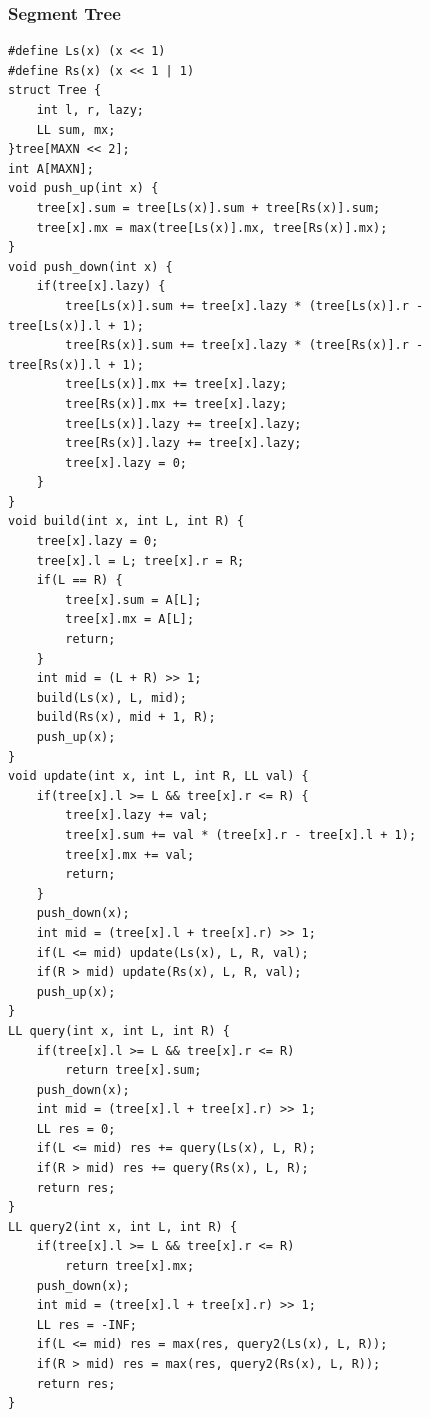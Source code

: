 \documentclass[10pt]{ctexart}
\begin{document}
{\subsubsection{Segment Tree}
\begin{lstlisting}
#define Ls(x) (x << 1)
#define Rs(x) (x << 1 | 1)
struct Tree {
    int l, r, lazy;
    LL sum, mx;
}tree[MAXN << 2];
int A[MAXN];
void push_up(int x) {
    tree[x].sum = tree[Ls(x)].sum + tree[Rs(x)].sum;
    tree[x].mx = max(tree[Ls(x)].mx, tree[Rs(x)].mx);
}
void push_down(int x) {
    if(tree[x].lazy) {
        tree[Ls(x)].sum += tree[x].lazy * (tree[Ls(x)].r - tree[Ls(x)].l + 1);
        tree[Rs(x)].sum += tree[x].lazy * (tree[Rs(x)].r - tree[Rs(x)].l + 1);
        tree[Ls(x)].mx += tree[x].lazy;
        tree[Rs(x)].mx += tree[x].lazy;
        tree[Ls(x)].lazy += tree[x].lazy;
        tree[Rs(x)].lazy += tree[x].lazy;
        tree[x].lazy = 0;
    }
}
void build(int x, int L, int R) {
    tree[x].lazy = 0;
    tree[x].l = L; tree[x].r = R;
    if(L == R) {
        tree[x].sum = A[L];
        tree[x].mx = A[L];
        return;
    }
    int mid = (L + R) >> 1;
    build(Ls(x), L, mid);
    build(Rs(x), mid + 1, R);
    push_up(x);
}
void update(int x, int L, int R, LL val) {
    if(tree[x].l >= L && tree[x].r <= R) {
        tree[x].lazy += val;
        tree[x].sum += val * (tree[x].r - tree[x].l + 1);
        tree[x].mx += val;
        return;
    }
    push_down(x);
    int mid = (tree[x].l + tree[x].r) >> 1;
    if(L <= mid) update(Ls(x), L, R, val);
    if(R > mid) update(Rs(x), L, R, val);
    push_up(x);
}
LL query(int x, int L, int R) {
    if(tree[x].l >= L && tree[x].r <= R)
        return tree[x].sum;
    push_down(x);
    int mid = (tree[x].l + tree[x].r) >> 1;
    LL res = 0;
    if(L <= mid) res += query(Ls(x), L, R);
    if(R > mid) res += query(Rs(x), L, R);
    return res;
}
LL query2(int x, int L, int R) {
    if(tree[x].l >= L && tree[x].r <= R)
        return tree[x].mx;
    push_down(x);
    int mid = (tree[x].l + tree[x].r) >> 1;
    LL res = -INF;
    if(L <= mid) res = max(res, query2(Ls(x), L, R));
    if(R > mid) res = max(res, query2(Rs(x), L, R));
    return res;
}
\end{lstlisting}
}
\end{document}
